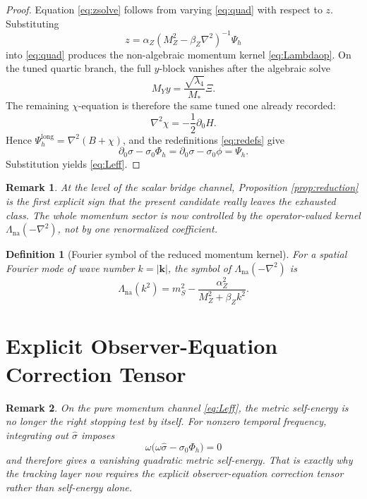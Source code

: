 \documentclass[11pt]{article}
\newtheorem{definition}{Definition}
\newtheorem{remark}{Remark}
\begin{document}
\begin{proof}
Equation \eqref{eq:zsolve} follows from varying \eqref{eq:quad} with respect to \(z\). Substituting
\[
z=\alpha_Z\left(M_Z^2-\beta_Z\nabla^2\right)^{-1}\Psi_h
\]
into \eqref{eq:quad} produces the non-algebraic momentum kernel \eqref{eq:Lambdaop}. On the tuned quartic branch, the full \(y\)-block vanishes after the algebraic solve
\[
M_Yy=\frac{\sqrt{\lambda_4}}{M_*}\Xi.
\]
The remaining \(\chi\)-equation is therefore the same tuned one already recorded:
\[
\nabla^2\chi=-\frac12\partial_0H.
\]
Hence \(\Psi_{\!h}^{\mathrm{long}}=\nabla^2(B+\chi)\), and the redefinitions \eqref{eq:redefs} give
\[
\partial_0\hat\sigma-\sigma_0\Phi_h
=
\partial_0\sigma-\sigma_0\phi
=
\Psi_h.
\]
Substitution yields \eqref{eq:Leff}.
\end{proof}

\begin{remark}
At the level of the scalar bridge channel, Proposition \ref{prop:reduction} is the first explicit sign that the present candidate really leaves the exhausted class. The whole momentum sector is now controlled by the operator-valued kernel \(\Lambda_{\mathrm{na}}(-\nabla^2)\), not by one renormalized coefficient.
\end{remark}

\begin{definition}[Fourier symbol of the reduced momentum kernel]
\label{def:symbol}
For a spatial Fourier mode of wave number \(k=|\mathbf k|\), the symbol of \(\Lambda_{\mathrm{na}}(-\nabla^2)\) is
\begin{equation}
\Lambda_{\mathrm{na}}(k^2)
=
m_S^2-\frac{\alpha_Z^2}{M_Z^2+\beta_Zk^2}.
\label{eq:symbol}
\end{equation}
\end{definition}

\section{Explicit Observer-Equation Correction Tensor}

\begin{remark}
On the pure momentum channel \eqref{eq:Leff}, the metric self-energy is no longer the right stopping test by itself. For nonzero temporal frequency, integrating out \(\hat\sigma\) imposes
\[
\omega\bigl(\omega\hat\sigma-\sigma_0\Phi_h\bigr)=0
\]
and therefore gives a vanishing quadratic metric self-energy. That is exactly why the tracking layer now requires the explicit observer-equation correction tensor rather than self-energy alone.
\end{remark}
\end{document}
